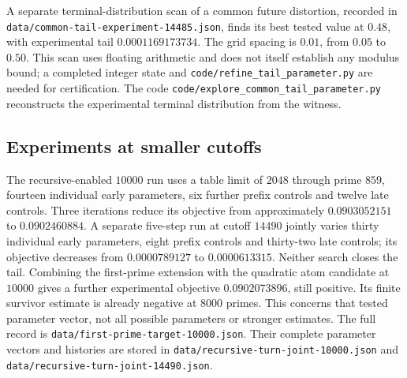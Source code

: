 \documentclass[11pt]{article}
\begin{document}
A separate terminal-distribution scan of a common future distortion,
recorded in \texttt{data/common-tail-experiment-14485.json}, finds its best
tested value at $0.48$, with experimental tail $0.0001169173734$.
The grid spacing is $0.01$, from $0.05$ to $0.50$. This scan uses floating
arithmetic and does not itself establish any modulus bound; a completed
integer state and \texttt{code/refine\_tail\_parameter.py} are needed for
certification. The code \texttt{code/explore\_common\_tail\_parameter.py}
reconstructs the experimental terminal distribution from the witness.

\subsection{Experiments at smaller cutoffs}
The recursive-enabled $10000$ run uses a table limit of $2048$ through
prime $859$, fourteen individual early parameters, six further prefix
controls and twelve late controls. Three iterations reduce its objective
from approximately $0.0903052151$ to $0.0902460884$. A separate five-step
run at cutoff $14490$ jointly varies thirty individual early parameters,
eight prefix controls and thirty-two late controls; its objective decreases
from $0.0000789127$ to $0.0000613315$. Neither search closes the tail.
Combining the first-prime extension with the quadratic atom candidate at
$10000$ gives a further experimental objective $0.0902073896$, still
positive. Its finite survivor estimate is already negative at $8000$
primes. This concerns that tested parameter vector, not all possible
parameters or stronger estimates. The full record is
\texttt{data/first-prime-target-10000.json}.
Their complete parameter vectors and histories are stored in
\texttt{data/recursive-turn-joint-10000.json} and
\texttt{data/recursive-turn-joint-14490.json}.
\end{document}
